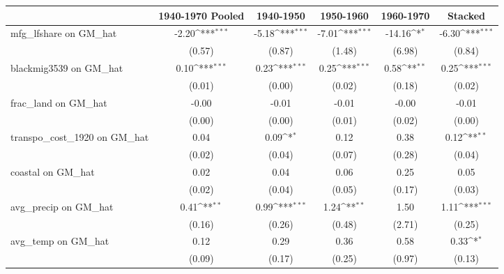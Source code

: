 {
\def\sym#1{\ifmmode^{#1}\else\(^{#1}\)\fi}
\begin{tabular}{l*{5}{c}}
\toprule
                &\multicolumn{1}{c}{1940-1970 Pooled}&\multicolumn{1}{c}{1940-1950}&\multicolumn{1}{c}{1950-1960}&\multicolumn{1}{c}{1960-1970}&\multicolumn{1}{c}{Stacked}\\
\midrule
mfg\_lfshare on GM\_hat&    -2.20\sym{***}&    -5.18\sym{***}&    -7.01\sym{***}&   -14.16\sym{*}  &    -6.30\sym{***}\\
                &   (0.57)         &   (0.87)         &   (1.48)         &   (6.98)         &   (0.84)         \\
\addlinespace
blackmig3539 on GM\_hat&     0.10\sym{***}&     0.23\sym{***}&     0.25\sym{***}&     0.58\sym{**} &     0.25\sym{***}\\
                &   (0.01)         &   (0.00)         &   (0.02)         &   (0.18)         &   (0.02)         \\
\addlinespace
frac\_land on GM\_hat&    -0.00         &    -0.01         &    -0.01         &    -0.00         &    -0.01         \\
                &   (0.00)         &   (0.00)         &   (0.01)         &   (0.02)         &   (0.00)         \\
\addlinespace
transpo\_cost\_1920 on GM\_hat&     0.04         &     0.09\sym{*}  &     0.12         &     0.38         &     0.12\sym{**} \\
                &   (0.02)         &   (0.04)         &   (0.07)         &   (0.28)         &   (0.04)         \\
\addlinespace
coastal on GM\_hat&     0.02         &     0.04         &     0.06         &     0.25         &     0.05         \\
                &   (0.02)         &   (0.04)         &   (0.05)         &   (0.17)         &   (0.03)         \\
\addlinespace
avg\_precip on GM\_hat&     0.41\sym{**} &     0.99\sym{***}&     1.24\sym{**} &     1.50         &     1.11\sym{***}\\
                &   (0.16)         &   (0.26)         &   (0.48)         &   (2.71)         &   (0.25)         \\
\addlinespace
avg\_temp on GM\_hat&     0.12         &     0.29         &     0.36         &     0.58         &     0.33\sym{*}  \\
                &   (0.09)         &   (0.17)         &   (0.25)         &   (0.97)         &   (0.13)         \\

\end{tabular}}
